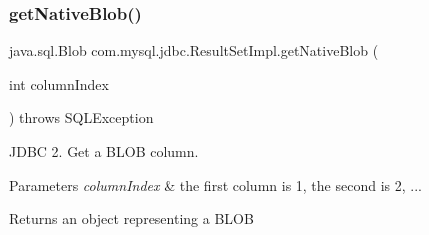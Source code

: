 \mbox{\label{classcom_1_1mysql_1_1jdbc_1_1_result_set_impl_a3ba3c173658eb8ab87c1f0040cc50fac}} 
\subsubsection{\texorpdfstring{get\+Native\+Blob()}{getNativeBlob()}}
{\footnotesize\ttfamily java.\+sql.\+Blob com.\+mysql.\+jdbc.\+Result\+Set\+Impl.\+get\+Native\+Blob (\begin{DoxyParamCaption}\item[{int}]{column\+Index }\end{DoxyParamCaption}) throws S\+Q\+L\+Exception\hspace{0.3cm}{\ttfamily [protected]}}

J\+D\+BC 2. Get a B\+L\+OB column.


\begin{DoxyParams}{Parameters}
{\em column\+Index} & the first column is 1, the second is 2, ...\\
\hline
\end{DoxyParams}
\begin{DoxyReturn}{Returns}
an object representing a B\+L\+OB
\end{DoxyReturn}

